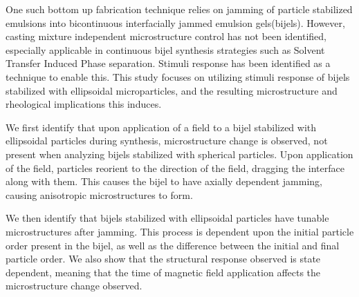 \begin{front}
One such bottom up fabrication technique relies on jamming of particle stabilized emulsions into bicontinuous 
interfacially jammed emulsion gels(bijels). However, casting mixture independent microstructure control has not 
been identified, especially applicable in continuous bijel synthesis strategies such as Solvent Transfer Induced 
Phase separation. Stimuli response has been identified as a technique to enable this. This study focuses on utilizing 
stimuli response of bijels stabilized with ellipsoidal microparticles, and the resulting microstructure and rheological 
implications this induces. 

We first identify that upon application of a field to a bijel stabilized with ellipsoidal particles during synthesis, 
microstructure change is observed, not present when analyzing bijels stabilized with spherical particles. Upon 
application of the field, particles reorient to the direction of the field, dragging the interface along with 
them. This causes the bijel to have axially dependent jamming, causing anisotropic microstructures to form.

We then identify that bijels stabilized with ellipsoidal particles have tunable microstructures after jamming. 
This process is dependent upon the initial particle order present in the bijel, as well as the difference 
between the initial and final particle order. We also show that the structural response observed is state 
dependent, meaning that the time of magnetic field application affects the microstructure change observed.

\end{front}

